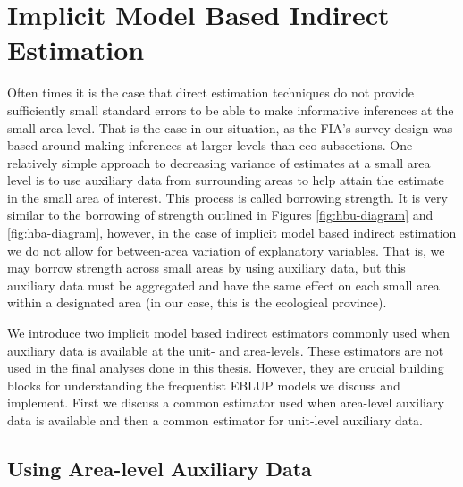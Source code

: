 \documentclass[12pt,twoside]{reedthesis}
\begin{document}
\hypertarget{implicit-model-based-indirect-estimation}{%
\section{Implicit Model Based Indirect Estimation}\label{implicit-model-based-indirect-estimation}}

Often times it is the case that direct estimation techniques do not provide sufficiently small standard errors to be able to make informative inferences at the small area level. That is the case in our situation, as the FIA's survey design was based around making inferences at larger levels than eco-subsections. One relatively simple approach to decreasing variance of estimates at a small area level is to use auxiliary data from surrounding areas to help attain the estimate in the small area of interest. This process is called borrowing strength. It is very similar to the borrowing of strength outlined in Figures \ref{fig:hbu-diagram} and \ref{fig:hba-diagram}, however, in the case of implicit model based indirect estimation we do not allow for between-area variation of explanatory variables. That is, we may borrow strength across small areas by using auxiliary data, but this auxiliary data must be aggregated and have the same effect on each small area within a designated area (in our case, this is the ecological province).

We introduce two implicit model based indirect estimators commonly used when auxiliary data is available at the unit- and area-levels. These estimators are not used in the final analyses done in this thesis. However, they are crucial building blocks for understanding the frequentist EBLUP models we discuss and implement. First we discuss a common estimator used when area-level auxiliary data is available and then a common estimator for unit-level auxiliary data.

\hypertarget{using-area-level-auxiliary-data}{%
\subsection{Using Area-level Auxiliary Data}\label{using-area-level-auxiliary-data}}
\end{document}
